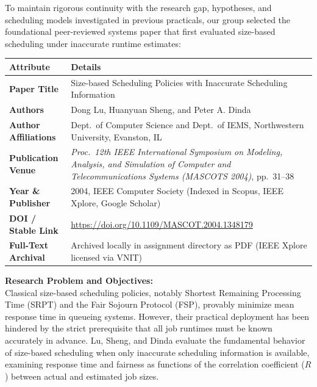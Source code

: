 \documentclass[11pt]{article}
\newcommand{\subTitle}[1]{
    \vspace{0.25em}\noindent{\fontsize{11}{13.5}\selectfont \textbf{#1}}\par\vspace{0.15em}
}
\begin{document}
To maintain rigorous continuity with the research gap, hypotheses, and scheduling models investigated in previous practicals, our group selected the foundational peer-reviewed systems paper that first evaluated size-based scheduling under inaccurate runtime estimates:

\vspace{0.2em}
\begin{center}
\small
\renewcommand{\arraystretch}{1.2}
\begin{tabular}{@{}p{3.2cm} p{12.4cm}@{}}
    \toprule
    \textbf{Attribute} & \textbf{Details} \\
    \midrule
    \textbf{Paper Title} & Size-based Scheduling Policies with Inaccurate Scheduling Information \\
    \textbf{Authors} & Dong Lu, Huanyuan Sheng, and Peter A. Dinda \\
    \textbf{Author Affiliations} & Dept.\ of Computer Science and Dept.\ of IEMS, Northwestern University, Evanston, IL \\
    \textbf{Publication Venue} & \textit{Proc.\ 12th IEEE International Symposium on Modeling, Analysis, and Simulation of Computer and Telecommunications Systems (MASCOTS 2004)}, pp.~31--38 \\
    \textbf{Year \& Publisher} & 2004, IEEE Computer Society (Indexed in Scopus, IEEE Xplore, Google Scholar) \\
    \textbf{DOI / Stable Link} & \url{https://doi.org/10.1109/MASCOT.2004.1348179} \\
    \textbf{Full-Text Archival} & Archived locally in assignment directory as PDF (IEEE Xplore licensed via VNIT) \\
    \bottomrule
\end{tabular}
\end{center}

\vspace{0.4em}
\subTitle{2. Structured Technical Summary }

\textbf{Research Problem and Objectives:} \\
Classical size-based scheduling policies, notably Shortest Remaining Processing Time (SRPT) and the Fair Sojourn Protocol (FSP), provably minimize mean response time in queueing systems. However, their practical deployment has been hindered by the strict prerequisite that all job runtimes must be known accurately in advance. Lu, Sheng, and Dinda evaluate the fundamental behavior of size-based scheduling when only inaccurate scheduling information is available, examining response time and fairness as functions of the correlation coefficient ($R$) between actual and estimated job sizes.
\end{document}
